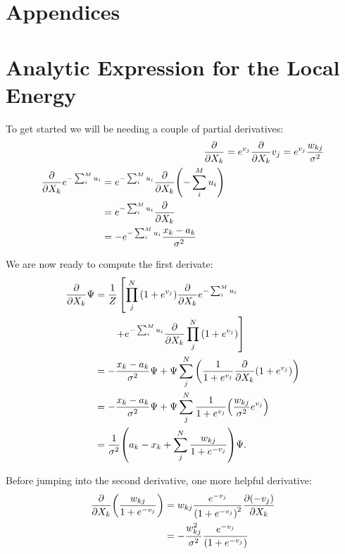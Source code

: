 \documentclass[a4paper, 11pt]{article}
\begin{document}
\pagebreak
\begin{multicols}{2}
    \appendix
    \section*{Appendices}

    \section{Analytic Expression for the Local Energy}
    \label{app:E-L-derivation}
    
    To get started we will be needing a couple of partial derivatives:
   \begin{align}
        \pdv{}{X_k} (1+e^{v_j}) &=e^{v_j}\pdv{}{X_k}v_j =
        e^{v_j} \frac{w_{kj}}{\sigma^2}\\
        \begin{split}
        \pdv{}{X_k}e^{-\sum_i^M u_i} &= e^{-\sum_i^M
        u_i}\pdv{}{X_k}\qty(-\sum_i^M u_i) \\
        &= e^{-\sum_i^M u_i}\pdv{}{X_k} (-u_k) \\
        &= -e^{-\sum_i^M u_i} \frac{x_k-a_k}{\sigma^2}
        \end{split}
    \end{align}

    We are now ready to compute the first derivate:
    \begin{align*}
        \pdv{}{X_k}\Psi &= \frac{1}{Z} \left[\prod_j^N
        \qty(1+e^{v_j})\pdv{}{X_k}e^{-\sum_i^M u_i}\right.\\
        &\quad{  }\quad{    }\left. + e^{-\sum_i^M
        u_i}\pdv{}{X_k} \prod_j^N \qty(1+e^{v_j})\right]\\
        &= -\frac{x_k-a_k}{\sigma^2}\Psi + \Psi \sum_j^N
        \qty(\frac{1}{1+e^{v_j}}\pdv{}{X_k}\qty(1+e^{v_j}))\\
        &= -\frac{x_k-a_k}{\sigma^2}\Psi + \Psi\sum_j^N
        \frac{1}{1+e^{v_j}}\qty(\frac{w_{kj}}{\sigma^2} e^{v_j})\\
        &= \frac{1}{\sigma^2}\qty(a_k-x_k + \sum_j^N
        \frac{w_{kj}}{1+e^{-v_j}})\Psi.
    \end{align*}

    Before jumping into the second derivative, one more helpful derivative:
    \begin{align}
        \begin{split}
        \pdv{}{X_k}\qty(\frac{w_{kj}}{1+e^{-v_j}}) &=
            w_{kj}\frac{e^{-v_j}}{\qty(1+e^{-v_j})^2}\pdv{(-v_j)}{X_k}\\
        &= -\frac{w_{kj}^2}{\sigma^2} \frac{e^{-v_j}}{\qty(1+e^{-v_j})}
        \end{split}
    \end{align}


\end{multicols}
\end{document}
